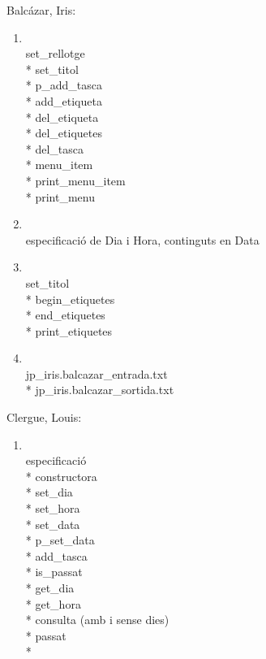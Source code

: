 \documentclass[a4paper,11pt]{article}
\begin{document}
\begin{description}
  \item \textsf{Balcázar, Iris}:
  \begin{enumerate}
    \item[Agenda] \hfill \\
    set\_rellotge \\*
    set\_titol \\*
    p\_add\_tasca \\*  
    add\_etiqueta \\*
    del\_etiqueta \\*
    del\_etiquetes \\*
    del\_tasca \\*
    menu\_item \\*
    print\_menu\_item \\*
    print\_menu
    \item[Data] \hfill \\
    especificaci\'o de Dia i Hora, continguts en Data
    \item[Tasca] \hfill \\
    set\_titol \\*
    begin\_etiquetes \\*
    end\_etiquetes \\*
    print\_etiquetes
    \item[Jocs de prova] \hfill \\
    jp\_iris.balcazar\_entrada.txt \\*
    jp\_iris.balcazar\_sortida.txt
  \end{enumerate}
  \newpage
  \item \textsf{Clergue, Louis}:
  \begin{enumerate}
    \item[Agenda] \hfill \\
    especificació \\*
    constructora \\*
    set\_dia \\*
    set\_hora \\*
    set\_data \\*
    p\_set\_data \\*
    add\_tasca \\*
    is\_passat \\*
    get\_dia \\*
    get\_hora \\*
    consulta (amb i sense dies) \\*
    passat \\*

\end{enumerate}
\end{description}
\end{document}
